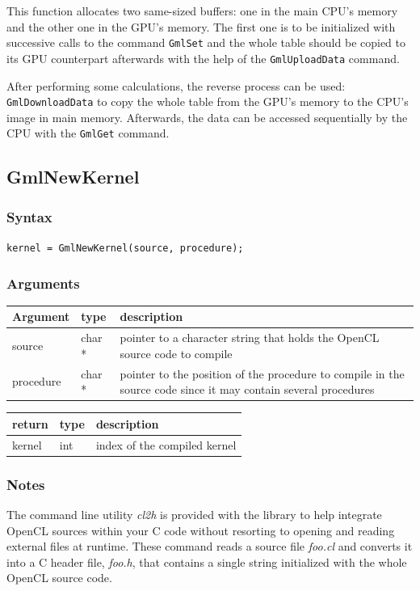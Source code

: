 \documentclass[a4paper,12pt]{article}
\begin{document}
This function allocates two same-sized buffers: one in the main CPU's memory and the other one in the GPU's memory. The first one is to be initialized with successive calls to the command {\tt GmlSet} and the whole table should be copied to its GPU counterpart afterwards with the help of the {\tt GmlUploadData} command.

After performing some calculations, the reverse process can be used: {\tt GmlDownloadData} to copy the whole table from the GPU's memory to the CPU's image in main memory. Afterwards, the data can be accessed sequentially by the CPU with the {\tt GmlGet} command.


\subsection{GmlNewKernel}
\subsubsection*{Syntax}
{\tt kernel = GmlNewKernel(source, procedure);}
\subsubsection*{Arguments}

\begin{tabular}{|m{2cm}|m{1.5cm}|m{10.5cm}|}
\hline
Argument   & type   & description \\
\hline
source     & char * & pointer to a character string that holds the OpenCL source code to compile \\
\hline
procedure  & char * & pointer to the position of the procedure to compile in the source code since it may contain several procedures \\
\hline
\end{tabular}

\medskip

\begin{tabular}{|m{2cm}|m{1.5cm}|m{10.5cm}|}
\hline
return     & type   & description \\
\hline
kernel     & int    & index of the compiled kernel \\
\hline
\end{tabular}

\subsubsection*{Notes}
The command line utility \emph{cl2h} is provided with the library to help integrate OpenCL sources within your C code without resorting to opening and reading external files at runtime. These command reads a source file \emph{foo.cl} and converts it into a C header file, \emph{foo.h}, that contains a single string initialized with the whole OpenCL source code.
\end{document}
